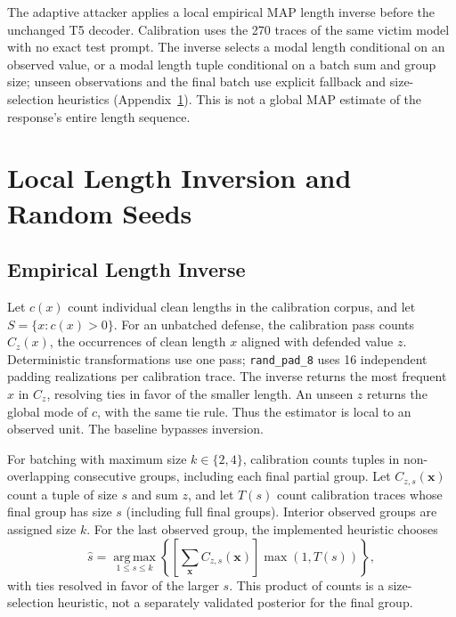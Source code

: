 The adaptive attacker applies a local empirical MAP length inverse before the unchanged T5 decoder. Calibration uses the 270 traces of the same victim model with no exact test prompt. The inverse selects a modal length conditional on an observed value, or a modal length tuple conditional on a batch sum and group size; unseen observations and the final batch use explicit fallback and size-selection heuristics (Appendix~\ref{app:map-seeds}). This is not a global MAP estimate of the response's entire length sequence.

\section{Local Length Inversion and Random Seeds}\label{app:map-seeds}

\subsection{Empirical Length Inverse}
Let $c(x)$ count individual clean lengths in the calibration corpus, and let $S=\{x:c(x)>0\}$. For an unbatched defense, the calibration pass counts $C_z(x)$, the occurrences of clean length $x$ aligned with defended value $z$. Deterministic transformations use one pass; \texttt{rand\_pad\_8} uses 16 independent padding realizations per calibration trace. The inverse returns the most frequent $x$ in $C_z$, resolving ties in favor of the smaller length. An unseen $z$ returns the global mode of $c$, with the same tie rule. Thus the estimator is local to an observed unit. The baseline bypasses inversion.

For batching with maximum size $k\in\{2,4\}$, calibration counts tuples in non-overlapping consecutive groups, including each final partial group. Let $C_{z,s}(\mathbf{x})$ count a tuple of size $s$ and sum $z$, and let $T(s)$ count calibration traces whose final group has size $s$ (including full final groups). Interior observed groups are assigned size $k$. For the last observed group, the implemented heuristic chooses
\[
 \widehat{s}=\operatorname*{arg\,max}_{1\leq s\leq k}
 \left\{\left[\sum_{\mathbf{x}} C_{z,s}(\mathbf{x})\right]\max(1,T(s))\right\},
\]
with ties resolved in favor of the larger $s$. This product of counts is a size-selection heuristic, not a separately validated posterior for the final group.

